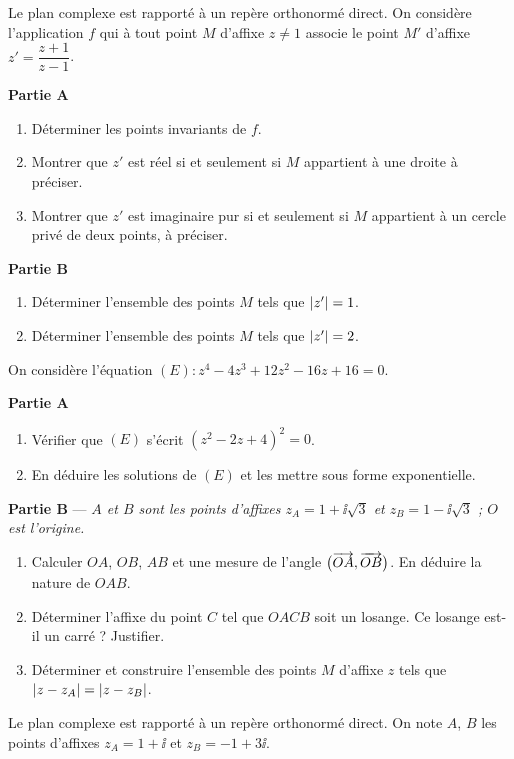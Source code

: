 Le plan complexe est rapporté à un repère orthonormé direct. On considère
l'application $f$ qui à tout point $M$ d'affixe $z \neq 1$ associe le point
$M'$ d'affixe $z' = \dfrac{z + 1}{z - 1}$.

\textbf{Partie A}
\begin{enumerate}
	\item Déterminer les points invariants de $f$.
	\item Montrer que $z'$ est réel si et seulement si $M$ appartient à une
	droite à préciser.
	\item Montrer que $z'$ est imaginaire pur si et seulement si $M$ appartient
	à un cercle privé de deux points, à préciser.
\end{enumerate}

\textbf{Partie B}
\begin{enumerate}
	\item Déterminer l'ensemble des points $M$ tels que $\left|z'\right| = 1$.
	\item Déterminer l'ensemble des points $M$ tels que $\left|z'\right| = 2$.
\end{enumerate}

On considère l'équation $(E) : z^4 - 4z^3 + 12z^2 - 16z + 16 = 0$.

\textbf{Partie A}
\begin{enumerate}
	\item Vérifier que $(E)$ s'écrit $(z^2 - 2z + 4)^2 = 0$.
	\item En déduire les solutions de $(E)$ et les mettre sous forme
	exponentielle.
\end{enumerate}

\textbf{Partie B} — \textit{$A$ et $B$ sont les points d'affixes
$z_A = 1 + \ii\sqrt3$ et $z_B = 1 - \ii\sqrt3$ ; $O$ est l'origine.}
\begin{enumerate}
	\item Calculer $OA$, $OB$, $AB$ et une mesure de l'angle
	$\bigl(\overrightarrow{OA},\overrightarrow{OB}\bigr)$. En déduire la nature de $OAB$.
	\item Déterminer l'affixe du point $C$ tel que $OACB$ soit un losange.
	Ce losange est-il un carré ? Justifier.
	\item Déterminer et construire l'ensemble des points $M$ d'affixe $z$ tels
	que $\left|z - z_A\right| = \left|z - z_B\right|$.
\end{enumerate}

Le plan complexe est rapporté à un repère orthonormé direct. On note $A$, $B$
les points d'affixes $z_A = 1 + \ii$ et $z_B = -1 + 3\ii$.

